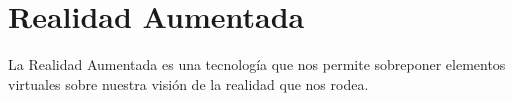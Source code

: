 \section{Realidad Aumentada}

  La Realidad Aumentada es una tecnología que nos permite sobreponer elementos virtuales sobre nuestra visión de la realidad que nos rodea. 
  
